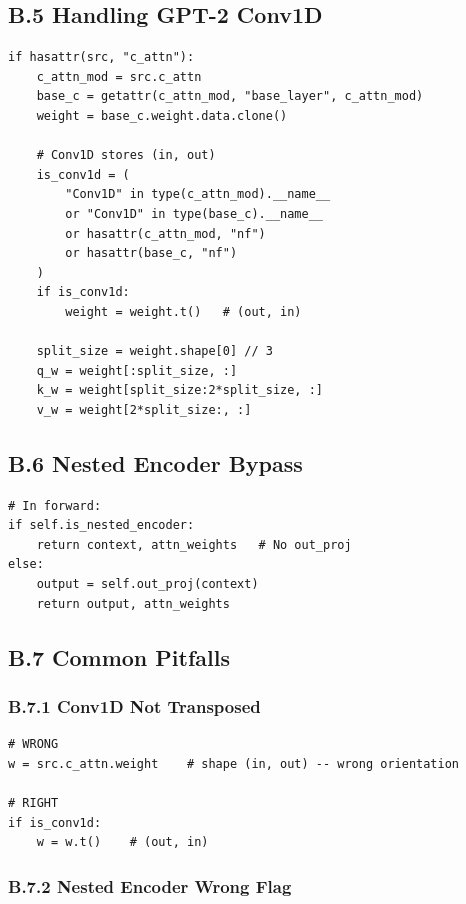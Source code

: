 \subsection{B.5 Handling GPT-2 Conv1D}

\begin{lstlisting}
if hasattr(src, "c_attn"):
    c_attn_mod = src.c_attn
    base_c = getattr(c_attn_mod, "base_layer", c_attn_mod)
    weight = base_c.weight.data.clone()
    
    # Conv1D stores (in, out)
    is_conv1d = (
        "Conv1D" in type(c_attn_mod).__name__
        or "Conv1D" in type(base_c).__name__
        or hasattr(c_attn_mod, "nf")
        or hasattr(base_c, "nf")
    )
    if is_conv1d:
        weight = weight.t()   # (out, in)
    
    split_size = weight.shape[0] // 3
    q_w = weight[:split_size, :]
    k_w = weight[split_size:2*split_size, :]
    v_w = weight[2*split_size:, :]
\end{lstlisting}

\subsection{B.6 Nested Encoder Bypass}

\begin{lstlisting}
# In forward:
if self.is_nested_encoder:
    return context, attn_weights   # No out_proj
else:
    output = self.out_proj(context)
    return output, attn_weights
\end{lstlisting}

\subsection{B.7 Common Pitfalls}

\subsubsection{B.7.1 Conv1D Not Transposed}

\begin{lstlisting}
# WRONG
w = src.c_attn.weight    # shape (in, out) -- wrong orientation

# RIGHT
if is_conv1d:
    w = w.t()    # (out, in)
\end{lstlisting}

\subsubsection{B.7.2 Nested Encoder Wrong Flag}

